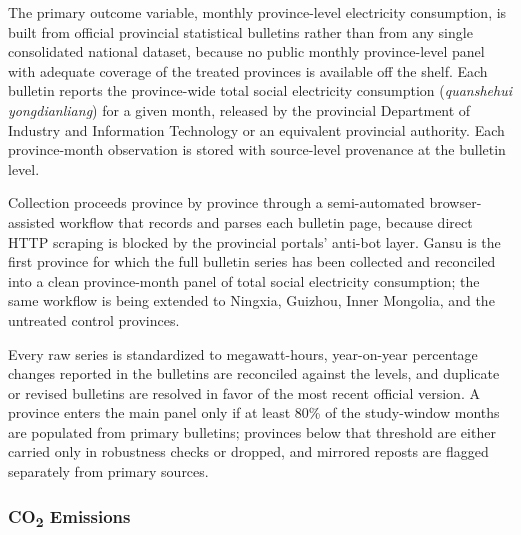 \documentclass[12pt,a4paper]{article}
\begin{document}
The primary outcome variable, monthly province-level electricity
consumption, is built from official provincial statistical bulletins
rather than from any single consolidated national dataset, because no
public monthly province-level panel with adequate coverage of the
treated provinces is available off the shelf. Each bulletin reports
the province-wide total social electricity consumption
(\textit{quanshehui yongdianliang}) for a given month, released by
the provincial Department of Industry and Information Technology or
an equivalent provincial authority. Each province-month observation
is stored with source-level provenance at the bulletin level.

Collection proceeds province by province through a semi-automated
browser-assisted workflow that records and parses each bulletin page,
because direct HTTP scraping is blocked by the provincial portals'
anti-bot layer. Gansu is the first province for which the full
bulletin series has been collected and reconciled into a clean
province-month panel of total social electricity consumption; the
same workflow is being extended to Ningxia, Guizhou, Inner Mongolia,
and the untreated control provinces.

Every raw series is standardized to megawatt-hours, year-on-year
percentage changes reported in the bulletins are reconciled against
the levels, and duplicate or revised bulletins are resolved in favor
of the most recent official version. A province enters the main panel
only if at least 80\% of the study-window months are populated from
primary bulletins; provinces below that threshold are either carried
only in robustness checks or dropped, and mirrored reposts are
flagged separately from primary sources.

\subsubsection{CO\textsubscript{2} Emissions}
%
\end{document}
